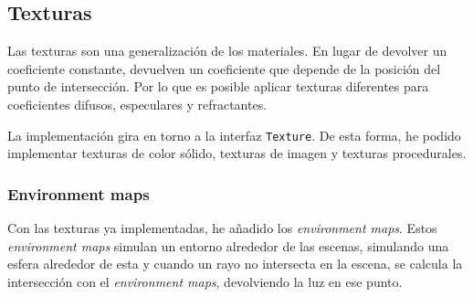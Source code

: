 \documentclass{article}
\begin{document}
\subsection{Texturas}
Las texturas son una generalización de los materiales. En lugar de devolver un
coeficiente constante, devuelven un coeficiente que depende de la posición del
punto de intersección. Por lo que es posible aplicar texturas diferentes para
coeficientes difusos, especulares y refractantes.

La implementación gira en torno a la interfaz \texttt{Texture}. De esta forma,
he podido implementar texturas de color sólido, texturas de imagen y texturas
procedurales.

\subsubsection{Environment maps}

Con las texturas ya implementadas, he añadido los \textit{environment maps}.
Estos \textit{environment maps} simulan un entorno alrededor de las escenas,
simulando una esfera alrededor de esta y cuando un rayo no intersecta en
la escena, se calcula la intersección con el \textit{environment maps},
devolviendo la luz en ese punto.
\end{document}
